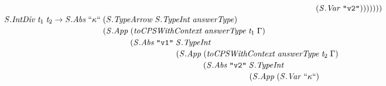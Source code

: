 \documentclass[10pt]{article}
\newcommand{\Conid}[1]{\mathit{#1}}
\newcommand{\Varid}[1]{\mathit{#1}}
\begin{document}
\begin{hscode}
${\hskip1.00em\relax\hskip1.00em\relax\phantom{\Conid{\Conid{S}.IntMul}\;\Varid{t}_{1}\;\Varid{t}_{2}\to \Conid{\Conid{S}.Abs}\;\text{``}\kappa\text{``}\;\mbox{}}\phantom{(\Conid{\Conid{S}.App}\;\mbox{}}\phantom{(\Conid{\Conid{S}.Abs}\;\text{\tt \char34 v1\char34}\;\mbox{}}\phantom{(\Conid{\Conid{S}.App}\;\mbox{}}\phantom{(\Conid{\Conid{S}.Abs}\;\text{\tt \char34 v2\char34}\;\mbox{}}\phantom{(\Conid{\Conid{S}.App}\;\mbox{}}\phantom{(\Conid{\Conid{S}.IntMul}\;\mbox{}}(\Conid{\Conid{S}.Var}\;\text{\tt \char34 v2\char34})))))))}$\\
${\hskip1.00em\relax\hskip1.00em\relax\Conid{\Conid{S}.IntDiv}\;\Varid{t}_{1}\;\Varid{t}_{2}\to \Conid{\Conid{S}.Abs}\;\text{``}\kappa\text{``}\;(\Conid{\Conid{S}.TypeArrow}\;\Conid{\Conid{S}.TypeInt}\;\Varid{answerType})\;}$\\
${\hskip1.00em\relax\hskip1.00em\relax\phantom{\Conid{\Conid{S}.IntDiv}\;\Varid{t}_{1}\;\Varid{t}_{2}\to \Conid{\Conid{S}.Abs}\;\text{``}\kappa\text{``}\;\mbox{}}(\Conid{\Conid{S}.App}\;(\Varid{toCPSWithContext}\;\Varid{answerType}\;\Varid{t}_{1}\;\Gamma)\;}$\\
${\hskip1.00em\relax\hskip1.00em\relax\phantom{\Conid{\Conid{S}.IntDiv}\;\Varid{t}_{1}\;\Varid{t}_{2}\to \Conid{\Conid{S}.Abs}\;\text{``}\kappa\text{``}\;\mbox{}}\phantom{(\Conid{\Conid{S}.App}\;\mbox{}}(\Conid{\Conid{S}.Abs}\;\text{\tt \char34 v1\char34}\;\Conid{\Conid{S}.TypeInt}\;}$\\
${\hskip1.00em\relax\hskip1.00em\relax\phantom{\Conid{\Conid{S}.IntDiv}\;\Varid{t}_{1}\;\Varid{t}_{2}\to \Conid{\Conid{S}.Abs}\;\text{``}\kappa\text{``}\;\mbox{}}\phantom{(\Conid{\Conid{S}.App}\;\mbox{}}\phantom{(\Conid{\Conid{S}.Abs}\;\text{\tt \char34 v1\char34}\;\mbox{}}(\Conid{\Conid{S}.App}\;(\Varid{toCPSWithContext}\;\Varid{answerType}\;\Varid{t}_{2}\;\Gamma)\;}$\\
${\hskip1.00em\relax\hskip1.00em\relax\phantom{\Conid{\Conid{S}.IntDiv}\;\Varid{t}_{1}\;\Varid{t}_{2}\to \Conid{\Conid{S}.Abs}\;\text{``}\kappa\text{``}\;\mbox{}}\phantom{(\Conid{\Conid{S}.App}\;\mbox{}}\phantom{(\Conid{\Conid{S}.Abs}\;\text{\tt \char34 v1\char34}\;\mbox{}}\phantom{(\Conid{\Conid{S}.App}\;\mbox{}}(\Conid{\Conid{S}.Abs}\;\text{\tt \char34 v2\char34}\;\Conid{\Conid{S}.TypeInt}\;}$\\
${\hskip1.00em\relax\hskip1.00em\relax\phantom{\Conid{\Conid{S}.IntDiv}\;\Varid{t}_{1}\;\Varid{t}_{2}\to \Conid{\Conid{S}.Abs}\;\text{``}\kappa\text{``}\;\mbox{}}\phantom{(\Conid{\Conid{S}.App}\;\mbox{}}\phantom{(\Conid{\Conid{S}.Abs}\;\text{\tt \char34 v1\char34}\;\mbox{}}\phantom{(\Conid{\Conid{S}.App}\;\mbox{}}\phantom{(\Conid{\Conid{S}.Abs}\;\text{\tt \char34 v2\char34}\;\mbox{}}(\Conid{\Conid{S}.App}\;(\Conid{\Conid{S}.Var}\;\text{``}\kappa\text{``})\;}$\\

\end{hscode}
\end{document}
